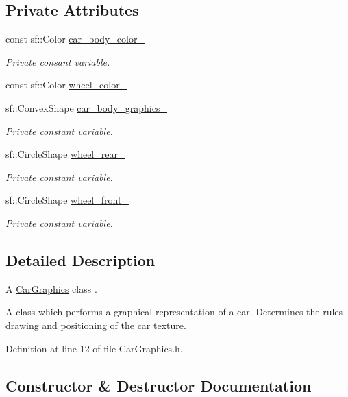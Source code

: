 \subsection*{Private Attributes}
\begin{DoxyCompactItemize}
\item 
const sf\+::\+Color \hyperlink{classCarGraphics_a3df8d600a272817a5c521cdc8c23c587}{car\+\_\+body\+\_\+color\+\_\+}
\begin{DoxyCompactList}\small\item\em Private consant variable. \end{DoxyCompactList}\item 
const sf\+::\+Color \hyperlink{classCarGraphics_adc369f5f948025767d40f2ad40e2568a}{wheel\+\_\+color\+\_\+}
\item 
sf\+::\+Convex\+Shape \hyperlink{classCarGraphics_a4e1969ef5f4326f10b83b1488484f660}{car\+\_\+body\+\_\+graphics\+\_\+}
\begin{DoxyCompactList}\small\item\em Private constant variable. \end{DoxyCompactList}\item 
sf\+::\+Circle\+Shape \hyperlink{classCarGraphics_a2a66d0c60b79f54a807a31afd76c4ad1}{wheel\+\_\+rear\+\_\+}
\begin{DoxyCompactList}\small\item\em Private constant variable. \end{DoxyCompactList}\item 
sf\+::\+Circle\+Shape \hyperlink{classCarGraphics_a2e004e7f0288f6ed1352ba9116b4d112}{wheel\+\_\+front\+\_\+}
\begin{DoxyCompactList}\small\item\em Private constant variable. \end{DoxyCompactList}\end{DoxyCompactItemize}


\subsection{Detailed Description}
A \hyperlink{classCarGraphics}{Car\+Graphics} class . 

A class which performs a graphical representation of a car. Determines the rules drawing and positioning of the car texture. 

Definition at line 12 of file Car\+Graphics.\+h.



\subsection{Constructor \& Destructor Documentation}
\mbox{\label{classCarGraphics_a37c8d0d08003f0a84495a3aedfe471db}} 
